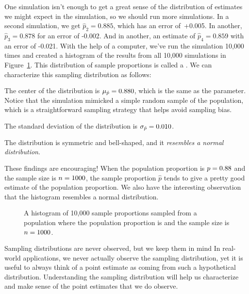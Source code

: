 One simulation isn't enough to get a great sense of the
distribution of estimates we might expect in the simulation,
so we should run more simulations.
In a second simulation,
we get $\hat{p}_2 = 0.885$, which has an error of~+0.005.
In another, $\hat{p}_3 = 0.878$ for an error of -0.002.
And in another,
an estimate of $\hat{p}_4 = 0.859$ with an error of -0.021.
With the help of a computer, we've run the simulation 10,000 times
and created a histogram of the results from all 10,000 simulations
in Figure~\ref{sampling_10k_prop_88p}. This
distribution of sample proportions is called a
.
We can characterize this sampling distribution as follows:
\begin{description}
\setlength{\itemsep}{0mm}
\item[Center.]
    The center of the distribution is
    $\mu_{\hat{p}} = 0.88{}0$,
    which is the same as the parameter.
    Notice that the simulation mimicked a simple random sample
    of the population, which is a straightforward sampling
    strategy that helps avoid sampling bias.
\item[Spread.]
    The standard deviation of the distribution
    is $\sigma_{\hat{p}} = 0.010{}$.
  
\item[Shape.]
    The distribution is symmetric and bell-shaped,
    and it \emph{resembles a normal distribution}.
\end{description}
These findings are encouraging!
When the population
proportion is $p = 0.88{}$ and the sample size is
$n = 1000{}$,
the sample proportion $\hat{p}$ tends to give
a pretty good estimate
of the population proportion.
We also have the interesting observation
that the histogram resembles a normal distribution.

\begin{figure}[h]
   \centering
   \caption{A histogram of 10,000 sample proportions sampled from a population where the population
       proportion is \pewsolarparprop{} and the sample size is
       $n = 1000{}$.}
   \label{sampling_10k_prop_88p}
\end{figure}

\begin{onebox}{Sampling distributions are
    never observed, but we keep them in mind}
  In real-world applications, we never actually observe the
  sampling distribution, yet it is useful to always think of
  a point estimate as coming from such a hypothetical
  distribution.
  \mbox{Understanding} the sampling distribution will help us
  characterize and make sense of the point estimates that we
  do observe.
\end{onebox}

